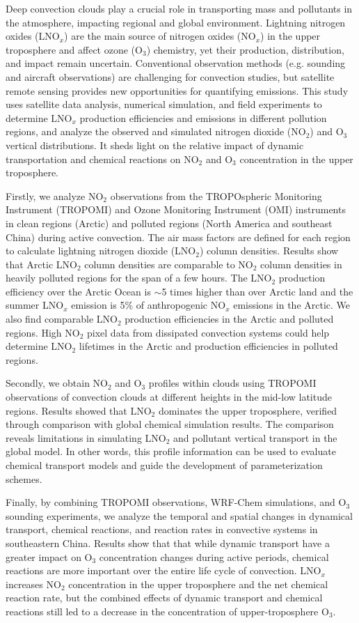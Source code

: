 {
Deep convection clouds play a crucial role in transporting mass and pollutants in the atmosphere, impacting regional and global environment.
Lightning nitrogen oxides (LNO$_x$) are the main source of nitrogen oxides (NO$_x$) in the upper troposphere
and affect ozone (O$_3$) chemistry, yet their production, distribution, and impact remain uncertain.
Conventional observation methods (e.g. sounding and aircraft observations) are challenging for convection studies,
but satellite remote sensing provides new opportunities for quantifying emissions.
This study uses satellite data analysis, numerical simulation, and field experiments to determine LNO$_x$ production efficiencies and emissions in different pollution regions,
and analyze the observed and simulated nitrogen dioxide (NO$_2$) and O$_3$ vertical distributions.
It sheds light on the relative impact of dynamic transportation and chemical reactions on NO$_2$ and O$_3$ concentration in the upper troposphere.

Firstly, we analyze NO$_2$ observations from the TROPOspheric Monitoring Instrument (TROPOMI) and
Ozone Monitoring Instrument (OMI) instruments in clean regions (Arctic) and polluted regions (North America and southeast China) during active convection.
The air mass factors are defined for each region to calculate lightning nitrogen dioxide (LNO$_2$) column densities.
Results show that Arctic LNO$_2$ column densities are comparable to NO$_2$ column densities in heavily polluted regions for the span of a few hours.
The LNO$_2$ production efficiency over the Arctic Ocean is $\sim$5 times higher than over Arctic land
and the summer LNO$_x$ emission is 5\% of anthropogenic NO$_x$ emissions in the Arctic.
We also find comparable LNO$_2$ production efficiencies in the Arctic and polluted regions.
High NO$_2$ pixel data from dissipated convection systems could help determine LNO$_2$ lifetimes in the Arctic and production efficiencies in polluted regions.

Secondly, we obtain NO$_2$ and O$_3$ profiles within clouds using TROPOMI observations of convection clouds at different heights in the mid-low latitude regions.
Results showed that LNO$_2$ dominates the upper troposphere, verified through comparison with global chemical simulation results.
The comparison reveals limitations in simulating LNO$_2$ and pollutant vertical transport in the global model.
In other words, this profile information can be used to evaluate chemical transport models and guide the development of parameterization schemes.

Finally, by combining TROPOMI observations, WRF-Chem simulations, and O$_3$ sounding experiments,
we analyze the temporal and spatial changes in dynamical transport, chemical reactions, and reaction rates in convective systems in southeastern China.
Results show that that while dynamic transport have a greater impact on O$_3$ concentration changes during active periods, chemical reactions are more important over the entire life cycle of convection.
LNO$_x$ increases NO$_2$ concentration in the upper troposphere and the net chemical reaction rate,
but the combined effects of dynamic transport and chemical reactions still led to a decrease in the concentration of upper-troposphere O$_3$.
}
